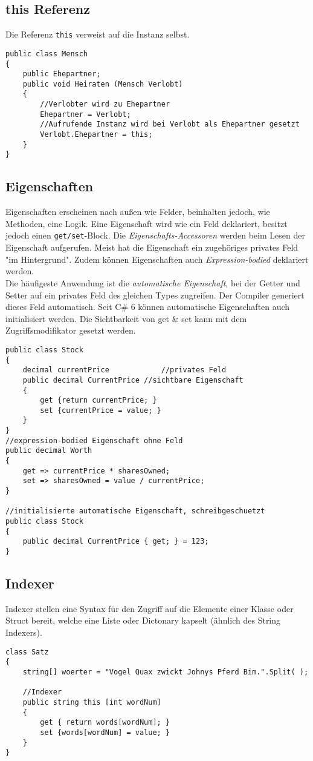 \subsection{this Referenz}
Die Referenz \texttt{this} verweist auf die Instanz selbst.
\begin{lstlisting}
public class Mensch
{
	public Ehepartner;
	public void Heiraten (Mensch Verlobt)
	{
		//Verlobter wird zu Ehepartner
		Ehepartner = Verlobt;
		//Aufrufende Instanz wird bei Verlobt als Ehepartner gesetzt
		Verlobt.Ehepartner = this;
	}
}
\end{lstlisting}
\subsection{Eigenschaften}
Eigenschaften erscheinen nach außen wie Felder, beinhalten jedoch, wie Methoden, eine Logik. Eine Eigenschaft wird wie ein Feld deklariert, besitzt jedoch einen \texttt{get/set}-Block. Die \textit{Eigenschafts-Accessoren} werden beim Lesen der Eigenschaft aufgerufen. Meist hat die Eigenschaft ein zugehöriges privates Feld "im Hintergrund". Zudem können Eigenschaften auch \textit{Expression-bodied} deklariert werden.\\[1em]
Die häufigeste Anwendung ist die \textit{automatische Eigenschaft}, bei der Getter und Setter auf ein privates Feld des gleichen Types zugreifen. Der Compiler generiert dieses Feld automatisch. Seit C\# 6 können automatische Eigenschaften auch initialisiert werden. Die Sichtbarkeit von get \& set kann mit dem Zugriffsmodifikator gesetzt werden.
\begin{lstlisting}
public class Stock
{
	decimal currentPrice			//privates Feld
	public decimal CurrentPrice	//sichtbare Eigenschaft
	{
		get {return currentPrice; }
		set {currentPrice = value; }
	}
}
//expression-bodied Eigenschaft ohne Feld
public decimal Worth
{
	get => currentPrice * sharesOwned;
	set => sharesOwned = value / currentPrice;
}

//initialisierte automatische Eigenschaft, schreibgeschuetzt
public class Stock
{
	public decimal CurrentPrice { get; } = 123;
}
\end{lstlisting}
\subsection{Indexer}
Indexer stellen eine Syntax für den Zugriff auf die Elemente einer Klasse oder Struct bereit, welche eine Liste oder Dictonary kapselt (ähnlich des String Indexers).
\begin{lstlisting}
class Satz
{
	string[] woerter = "Vogel Quax zwickt Johnys Pferd Bim.".Split( );

	//Indexer
	public string this [int wordNum]
	{
		get { return words[wordNum]; }
		set {words[wordNum] = value; }
	}
}
\end{lstlisting}
